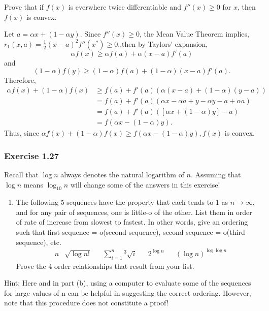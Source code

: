 \documentclass[12pt,]{article}
\providecommand{\tightlist}{%
  \setlength{\itemsep}{0pt}\setlength{\parskip}{0pt}}
\begin{document}
Prove that if \(f(x)\) is everwhere twice differentiable and
\(f''(x)\ge 0\) for \(x\), then \(f(x)\) is convex.

Let \(a = \alpha x+(1-\alpha y).\) Since \(f''(x)\ge 0\), the Mean Value
Theorem implies, \(r_1(x,a)=\frac{1}{2}(x-a)^2f''(x^{*})\ge 0.\),then by
Taylors' expansion, \[\alpha f(x) \ge \alpha f(a) + \alpha(x-a)f'(a)\]
and \[(1-\alpha) f(y) \ge (1-\alpha) f(a) + (1-\alpha)(x-a)f'(a).\]
Therefore, \begin{align*}
\alpha f(x) +(1-\alpha )f(x) & \ge f(a) + f'(a)\left(\alpha(x-a)+(1-\alpha)(y-a)\right)\\
& = f(a)+f'(a)\left(\alpha x - \alpha a + y -\alpha y - a +\alpha a\right)\\
& = f(a) +f'(a)\left([\alpha x + (1-\alpha)y]-a\right)\\
& = f(\alpha x - (1-\alpha)y).
\end{align*} Thus, since
\(\alpha f(x) +(1-\alpha )f(x) \ge f(\alpha x - (1-\alpha)y), f(x)\) is
convex.

\hypertarget{exercise-1.27}{%
\subsubsection{Exercise 1.27}\label{exercise-1.27}}

Recall that \(\log n\) always denotes the natural logarithm of \(n\).
Assuming that \(\log n\) means \(\log_{10} n\) will change some of the
answers in this exercise!

\begin{enumerate}
\def\labelenumi{\alph{enumi}.}
\tightlist
\item
  The following 5 sequences have the property that each tends to 1 as
  \(n\rightarrow\infty\), and for any pair of sequences, one is little-o
  of the other. List them in order of rate of increase from slowest to
  fastest. In other words, give an ordering such that first sequence =
  o(second sequence), second sequence = o(third sequence), etc.
  \begin{align*}
  &n &\sqrt{\log n!} && \sum_{i = 1}^n {^3\sqrt{i}} && 2^{\log n} && (\log n)^{\log\log n}
  \end{align*} Prove the 4 order relationships that result from your
  list.
\end{enumerate}

Hint: Here and in part (b), using a computer to evaluate some of the
sequences for large values of n can be helpful in suggesting the correct
ordering. However, note that this procedure does not constitute a proof!
\end{document}
